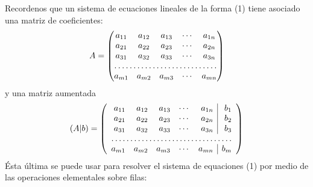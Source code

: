 \documentclass[12pt]{book}
\begin{document}
    Recordenos que un sistema de ecuaciones lineales de la forma (1) tiene asociado una matriz de coeficientes:
    \begin{equation}
        A=
        \begin{pmatrix}
            a_{11} & a_{12} & a_{13} & \cdots & a_{1n}  \\
            a_{21} & a_{22} & a_{23} & \cdots & a_{2n}  \\ 
            a_{31} & a_{32} & a_{33} & \cdots & a_{3n}  \\ 
            \hdotsfor{5} \\
            a_{m1} & a_{m2} & a_{m3} & \cdots & a_{mn}  \\  
        \end{pmatrix}
    \end{equation}
    y una matriz aumentada 
    \begin{equation}
        (A|b) =
        \left(
        \begin{array}{rrrrr|r} 
            a_{11} & a_{12} & a_{13} & \cdots & a_{1n} & b_{1} \\
            a_{21} & a_{22} & a_{23} & \cdots & a_{2n} & b_{2}\\ 
            a_{31} & a_{32} & a_{33} & \cdots & a_{3n} & b_{3} \\ 
            \hdotsfor{6} \\
            a_{m1} & a_{m2} & a_{m3} & \cdots & a_{mn} & b_{m} 
        \end{array} \right )
    \end{equation}
    Ésta última se puede usar para resolver el sistema de equaciones (1) por 
    medio de las operaciones elementales sobre filas: \\
    
\end{document}
